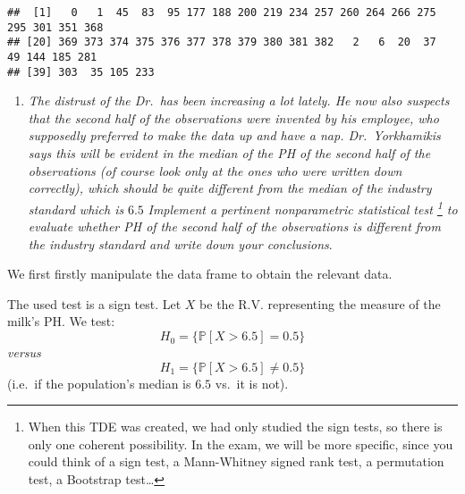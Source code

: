 \documentclass[
]{article}
\newenvironment{Shaded}{\begin{snugshade}}{\end{snugshade}}
\newcommand{\CommentTok}[1]{\textcolor[rgb]{0.56,0.35,0.01}{\textit{#1}}}
\newcommand{\DecValTok}[1]{\textcolor[rgb]{0.00,0.00,0.81}{#1}}
\newcommand{\FunctionTok}[1]{\textcolor[rgb]{0.13,0.29,0.53}{\textbf{#1}}}
\newcommand{\NormalTok}[1]{#1}
\newcommand{\OtherTok}[1]{\textcolor[rgb]{0.56,0.35,0.01}{#1}}
\newcommand{\SpecialCharTok}[1]{\textcolor[rgb]{0.81,0.36,0.00}{\textbf{#1}}}
\providecommand{\tightlist}{%
  \setlength{\itemsep}{0pt}\setlength{\parskip}{0pt}}
\begin{document}
\begin{verbatim}
##  [1]   0   1  45  83  95 177 188 200 219 234 257 260 264 266 275 295 301 351 368
## [20] 369 373 374 375 376 377 378 379 380 381 382   2   6  20  37  49 144 185 281
## [39] 303  35 105 233
\end{verbatim}

\begin{enumerate}
\def\labelenumi{\arabic{enumi}.}
\setcounter{enumi}{1}
\tightlist
\item
  \emph{The distrust of the Dr.~has been increasing a lot lately. He now
  also suspects that the second half of the observations were invented
  by his employee, who supposedly preferred to make the data up and have
  a nap. Dr.~Yorkhamikis says this will be evident in the median of the
  PH of the second half of the observations (of course look only at the
  ones who were written down correctly), which should be quite different
  from the median of the industry standard which is} \(6.5\)
  \emph{Implement a pertinent nonparametric statistical test \footnote{When
    this TDE was created, we had only studied the sign tests, so there
    is only one coherent possibility. In the exam, we will be more
    specific, since you could think of a sign test, a Mann-Whitney
    signed rank test, a permutation test, a Bootstrap test\ldots{}} to
  evaluate whether PH of the second half of the observations is
  different from the industry standard and write down your conclusions}.
\end{enumerate}

We first firstly manipulate the data frame to obtain the relevant data.

\begin{Shaded}
\end{Shaded}

The used test is a sign test. Let \(X\) be the R.V. representing the
measure of the milk's PH. We test: \[
H_0 = \{ \mathbb{P}[X > 6.5]  = 0.5 \}
\] \emph{versus} \[
H_1 = \{ \mathbb{P} [X > 6.5] \neq 0.5 \}
\] (i.e.~if the population's median is \(6.5\) vs.~it is not).
\end{document}

